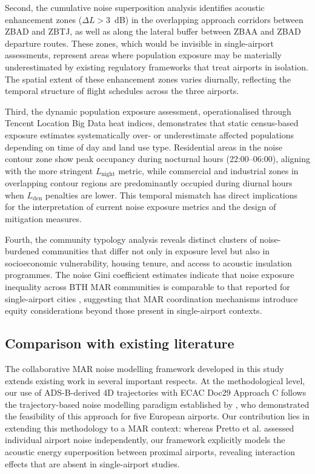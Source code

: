 \documentclass[review,12pt]{elsarticle}
\begin{document}
Second, the cumulative noise superposition analysis identifies acoustic enhancement zones ($\Delta L > 3$~dB) in the overlapping approach corridors between ZBAD and ZBTJ, as well as along the lateral buffer between ZBAA and ZBAD departure routes. These zones, which would be invisible in single-airport assessments, represent areas where population exposure may be materially underestimated by existing regulatory frameworks that treat airports in isolation. The spatial extent of these enhancement zones varies diurnally, reflecting the temporal structure of flight schedules across the three airports.

Third, the dynamic population exposure assessment, operationalised through Tencent Location Big Data heat indices, demonstrates that static census-based exposure estimates systematically over- or underestimate affected populations depending on time of day and land use type. Residential areas in the noise contour zone show peak occupancy during nocturnal hours (22:00--06:00), aligning with the more stringent $L_{\text{night}}$ metric, while commercial and industrial zones in overlapping contour regions are predominantly occupied during diurnal hours when $L_{\text{den}}$ penalties are lower. This temporal mismatch has direct implications for the interpretation of current noise exposure metrics and the design of mitigation measures.

Fourth, the community typology analysis reveals distinct clusters of noise-burdened communities that differ not only in exposure level but also in socioeconomic vulnerability, housing tenure, and access to acoustic insulation programmes. The noise Gini coefficient estimates indicate that noise exposure inequality across BTH MAR communities is comparable to that reported for single-airport cities \citep{audrin2022aircraft}, suggesting that MAR coordination mechanisms introduce equity considerations beyond those present in single-airport contexts.

\subsection{Comparison with existing literature}

The collaborative MAR noise modelling framework developed in this study extends existing work in several important respects. At the methodological level, our use of ADS-B-derived 4D trajectories with ECAC Doc29 Approach C follows the trajectory-based noise modelling paradigm established by \citet{pretto2024aircraft}, who demonstrated the feasibility of this approach for five European airports. Our contribution lies in extending this methodology to a MAR context: whereas Pretto et al. assessed individual airport noise independently, our framework explicitly models the acoustic energy superposition between proximal airports, revealing interaction effects that are absent in single-airport studies.
\end{document}
